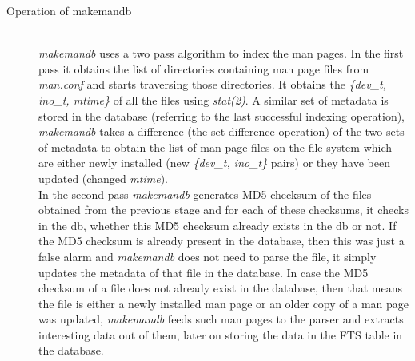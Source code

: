 \documentclass[letterpaper,twocolumn,10pt]{article}
\begin{document}
\begin{description}
\item[Operation of makemandb] \hfill \\
\textit{makemandb} uses a two pass algorithm to index the man pages. In the first pass it obtains the list of directories containing man page files from
\textit{man.conf} and starts traversing those directories. It obtains the
\textit{\{dev\_t, ino\_t, mtime\}} of all the files using \textit{stat(2)}.
A similar set of metadata is stored in the database (referring to the last successful indexing operation), \textit{makemandb} takes a difference (the set difference operation) of the two sets of metadata to obtain the list of man page files on the file system which are either newly installed (new \textit{\{dev\_t, ino\_t\}} pairs) or they have been updated (changed \textit{mtime}). \\

In the second pass \textit{makemandb} generates MD5 checksum of the files obtained from the previous stage and for each of these checksums, it checks in
the db, whether this MD5 checksum already exists in the db or not. If the MD5 checksum is already present in the database, then this was just a false alarm and \textit{makemandb} does not need to parse the file, it simply updates the metadata of that file in the database. In case the MD5 checksum of a file does not already exist in the database, then that means the file is either a newly installed man page or an older copy of a man page was updated,
\textit{makemandb} feeds such man pages to the parser and extracts interesting
data out of them, later on storing the data in the FTS table in the database.
\end{description}
\end{document}
